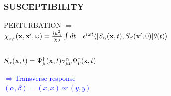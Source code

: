\documentclass[amssymb,amsmath]{beamer}
\newcommand{\blue}{\textcolor{blue}}
\newcommand{\red}{\textcolor{red}}
\newcommand\Fontvi{\fontsize{9}{9}\selectfont}
\begin{document}
\begin{frame} \frametitle{SUSCEPTIBILITY} 
PERTURBATION $\Rightarrow\,\,$  \\
$\chi_{_{\alpha\beta}}({\bf x},{\bf x}',\omega) = \frac{i\mu_B^2}{\chi_0}\int dt \quad e^{i\omega t}\langle [S_\alpha({\bf x},t), S_\beta({\bf x}',0)]\theta(t) \rangle$ 
\begin{columns}
\begin{column}{0.42\textwidth}
$S_\alpha({\bf x},t) = \Psi^\dagger_\mu({\bf x},t) \sigma^{\alpha}_{\mu\nu}  \Psi^\dagger_\nu({\bf x},t)$

\blue{\Fontvi $\Rightarrow$Transverse response \\\hspace{1cm}$(\alpha,\beta) = (x,x)\, or\, (y,y)$} \\

{\fbox{\red{$\chi(\vR,\vq) = \int d\vr e^{-i\vq\cdot\vr} \chi(\vR,\vr)$}}}


\end{column}
\end{columns}
\end{frame}
\end{document}
